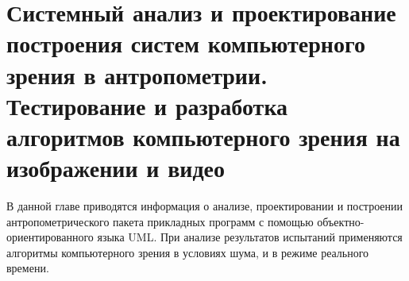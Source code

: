 

\chapter{Системный анализ и проектирование построения систем компьютерного зрения в антропометрии. Тестирование и разработка алгоритмов компьютерного зрения на изображении и видео}
В данной главе приводятся информация о анализе, проектировании и построении антропометрического пакета прикладных программ с помощью  объектно-ориентированного языка UML. При анализе результатов испытаний применяются алгоритмы компьютерного зрения в условиях шума, и в режиме реального времени.






